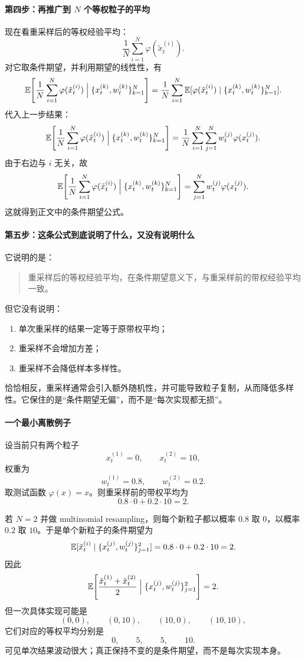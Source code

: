\documentclass[12pt,a4paper]{ctexart}
\begin{document}
\paragraph{第四步：再推广到 \(N\) 个等权粒子的平均}
现在看重采样后的等权经验平均：
\[
\frac1N\sum_{i=1}^N \varphi(\tilde x_t^{(i)}).
\]
对它取条件期望，并利用期望的线性性，有
\[
\mathbb{E}\!\left[\frac1N\sum_{i=1}^N \varphi(\tilde x_t^{(i)})
\Bigm| \{x_t^{(k)},w_t^{(k)}\}_{k=1}^N\right]
=
\frac1N\sum_{i=1}^N
\mathbb{E}[\varphi(\tilde x_t^{(i)}) \mid \{x_t^{(k)},w_t^{(k)}\}_{k=1}^N].
\]
代入上一步结果：
\[
\mathbb{E}\!\left[\frac1N\sum_{i=1}^N \varphi(\tilde x_t^{(i)})
\Bigm| \{x_t^{(k)},w_t^{(k)}\}_{k=1}^N\right]
=
\frac1N\sum_{i=1}^N
\sum_{j=1}^N w_t^{(j)} \varphi(x_t^{(j)}).
\]
由于右边与 \(i\) 无关，故
\[
\mathbb{E}\!\left[\frac1N\sum_{i=1}^N \varphi(\tilde x_t^{(i)})
\Bigm| \{x_t^{(k)},w_t^{(k)}\}_{k=1}^N\right]
=
\sum_{j=1}^N w_t^{(j)} \varphi(x_t^{(j)}).
\]
这就得到正文中的条件期望公式。

\paragraph{第五步：这条公式到底说明了什么，又没有说明什么}
它说明的是：
\begin{quote}
重采样后的等权经验平均，在条件期望意义下，与重采样前的带权经验平均一致。
\end{quote}
但它没有说明：
\begin{enumerate}
  \item 单次重采样的结果一定等于原带权平均；
  \item 重采样不会增加方差；
  \item 重采样不会降低样本多样性。
\end{enumerate}
恰恰相反，重采样通常会引入额外随机性，并可能导致粒子复制，从而降低多样性。它保住的是“条件期望无偏”，而不是“每次实现都无损”。

\paragraph{一个最小离散例子}
设当前只有两个粒子
\[
x_t^{(1)}=0,\qquad x_t^{(2)}=10,
\]
权重为
\[
w_t^{(1)}=0.8,\qquad w_t^{(2)}=0.2.
\]
取测试函数 \(\varphi(x)=x\)。则重采样前的带权平均为
\[
0.8\cdot 0 + 0.2\cdot 10 = 2.
\]

若 \(N=2\) 并做 multinomial resampling，则每个新粒子都以概率 \(0.8\) 取 \(0\)，以概率 \(0.2\) 取 \(10\)。于是单个新粒子的条件期望为
\[
\mathbb{E}[\tilde x_t^{(i)} \mid \{x_t^{(j)},w_t^{(j)}\}_{j=1}^2]
= 0.8\cdot 0 + 0.2\cdot 10 = 2.
\]
因此
\[
\mathbb{E}\!\left[\frac{\tilde x_t^{(1)}+\tilde x_t^{(2)}}{2}
\Bigm| \{x_t^{(j)},w_t^{(j)}\}_{j=1}^2\right]
= 2.
\]
但一次具体实现可能是
\[
(0,0),\qquad (0,10),\qquad (10,0),\qquad (10,10),
\]
它们对应的等权平均分别是
\[
0,\qquad 5,\qquad 5,\qquad 10.
\]
可见单次结果波动很大；真正保持不变的是条件期望，而不是每次实现本身。
\end{document}
